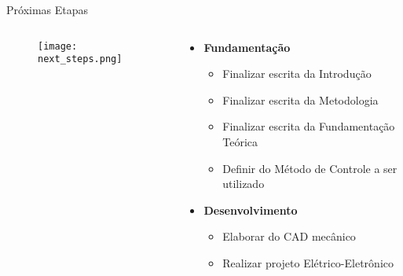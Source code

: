 \begin{frame}[t]{Próximas Etapas}
    \begin{columns}
        \begin{column}{0.25\textwidth}
            \begin{figure}
                \texttt{[image: next\_steps.png]}
            \end{figure}            
        \end{column}
        \begin{column}{0.75\textwidth}
            \begin{itemize}
                \item \textbf{Fundamentação}
                \begin{itemize}
                    \item Finalizar escrita da Introdução
                    \item Finalizar escrita da Metodologia
                    \item Finalizar escrita da Fundamentação Teórica
                    \item Definir do Método de Controle a ser utilizado     
                \end{itemize}
                \item \textbf{Desenvolvimento}
                \begin{itemize}
                    \item Elaborar do CAD mecânico
                    \item Realizar projeto Elétrico-Eletrônico
                \end{itemize}
            \end{itemize}            
        \end{column}
    \end{columns}

\end{frame}
